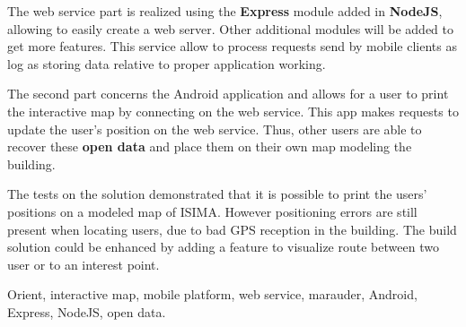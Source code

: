 The web service part is realized using the \textbf{Express} module added in \textbf{NodeJS}, allowing to easily create a web server. Other additional modules will be added to get more features. This service allow to process requests send by mobile clients as log as storing data relative to proper application working.

The second part concerns the Android application and allows for a user to print the interactive map by connecting on the web service. This app makes requests to update the user's position on the web service. Thus, other users are able to recover these \textbf{open data} and place them on their own map modeling the building.

The tests on the solution demonstrated that it is possible to print the users' positions on a modeled map of ISIMA. However positioning errors are still present when locating users, due to bad GPS reception in the building. The build solution could be enhanced by adding a feature to visualize route between two user or to an interest point.

Orient, interactive map, mobile platform, web service, marauder, Android, Express, NodeJS, open data.

